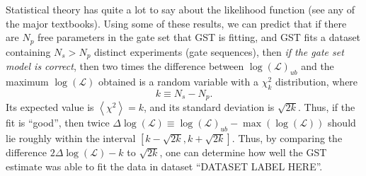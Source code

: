 \documentclass{article}[11pt]
\newcommand{\expec}[1]{\ensuremath{\left\langle#1\right\rangle}}
\newcommand{\putfield}[2]{#2}
\begin{document}
Statistical theory has quite a lot to say about the likelihood function (see any of the major textbooks).  Using some of these results, we can predict that if there are $N_p$ free parameters in the gate set that GST is fitting, and GST fits a dataset containing $N_s > N_p$ distinct experiments (gate sequences), then \emph{if the gate set model is correct}, then two times the difference between $\log(\mathcal{L})_{ub}$ and the maximum $\log(\mathcal{L})$ obtained is a random variable with a $\chi^2_{k}$ distribution, where 
$$k \equiv N_s - N_p.$$
Its expected value is $\expec{\chi^2}=k$, and its standard deviation is $\sqrt{2k}$.  Thus, if the fit is ``good'', then twice $\Delta\log(\mathcal{L}) \equiv \log(\mathcal{L})_{ub} - \max(\log(\mathcal{L}))$ should lie roughly within the interval $[k-\sqrt{2k},k+\sqrt{2k}]$.
Thus, by comparing the difference $2\Delta\log(\mathcal{L}) - k$ to $\sqrt{2k}$, one can determine how well the GST estimate was able to fit the data in dataset ``\putfield{datasetLabel}{DATASET LABEL HERE}''.
\end{document}
